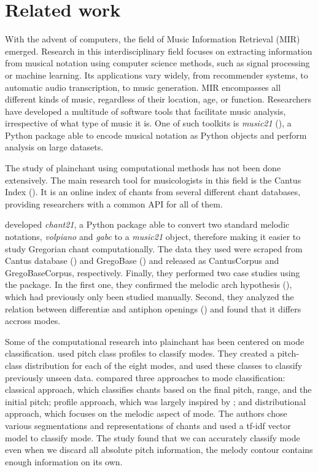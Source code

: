 \chapter{Related work}

With the advent of computers, the field of Music Information Retrieval (MIR) emerged. Research in this interdisciplinary field focuses on extracting
information from musical notation using computer science methods, such as signal processing or machine learning. Its applications
vary widely, from recommender systems, to automatic audio transcription, to music generation. MIR encompasses all different kinds of music,
regardless of their location, age, or function. Researchers have developed a multitude of software tools that facilitate music analysis,
irrespective of what type of music it is. One of such toolkits is \emph{music21} (\cite{music21}), a Python package able to encode musical notation
as Python objects and perform analysis on large datasets.

The study of plainchant using computational methods has not been done extensively. The main research tool for musicologists in this field
is the Cantus Index (\cite{cantus_index}). It is an online index of chants from several different chant databases, providing researchers with 
a common API for all of them.

\cite{chant21} developed \emph{chant21}, a Python package able to convert two standard melodic notations, \emph{volpiano} and \emph{gabc} to
a \emph{music21} object, therefore making it easier to study Gregorian chant computationally. The data they used were 
scraped from Cantus database (\cite{cantus_db}) and GregoBase (\cite{gregobase}) and released as CantusCorpus and GregoBaseCorpus, respectively.
Finally, they performed two case studies using the package. In the first one, they confirmed the melodic arch hypothesis (\cite{melodic_arch}), 
which had previously only been studied manually. Second, they analyzed the relation between differentiæ and antiphon openings (\cite{differentiae})
and found that it differs accross modes.

Some of the computational research into plainchant has been centered on mode classification. \cite{mode_huron} used pitch class profiles to
classify modes. They created a pitch-class distribution for each of the eight modes, and used these classes to classify previously unseen data.
\cite{mode_cornelissen} compared three approaches to mode classification: classical approach, which classifies chants based on
the final pitch, range, and the initial pitch; profile approach, which was largely inspired by \cite{mode_huron}; and distributional approach,
which focuses on the melodic aspect of mode. The authors chose various segmentations and representations of chants and used a tf-idf vector
model to classify mode. The study found that we can accurately classify mode even when we discard all absolute pitch information, the melody
contour contains enough information on its own.

